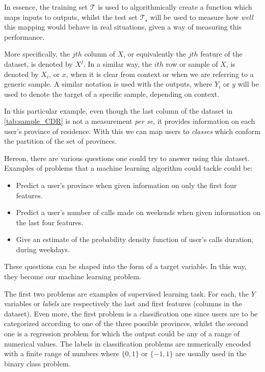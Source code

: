 In essence, the training set $\mathcal{T}$ is used to algorithmically create a function which maps inputs to outputs,  whilst the test set $\mathcal{T_s}$ will be used to measure how \textit{well} this mapping would behave in real situations, given a way of measuring this performance.

More specifically, the $jth$ column of $X$, or equivalently the $jth$ feature of the dataset, is denoted by $X^j$.
In a similar way, the $ith$ row or sample of $X$, is denoted by $X_i$, or $x$, when it is clear from context or when we are referring to a generic sample.
A similar notation is used with the outputs, where $Y_i$ or $y$ will be used to denote the target of a specific sample, depending on context.

In this particular example, even though the last column of the dataset in \cref{tab:sample_CDR} is not a measurement \textit{per se}, it provides information on each user's province of residence.
With this we can map users to \textit{classes} which conform the partition of the set of provinces.

Hereon, there are various questions one could try to answer using this dataset.
Examples of problems that a machine learning algorithm could tackle could be:

\begin{itemize}
\item Predict a user's province when given information on only the first four features.
\item Predict a user's number of calls made on weekends when given information on the last four features.
\item Give an estimate of the probability density function of user's calls duration, during weekdays.
\end{itemize}

These questions can be shaped into the form of a target variable.
In this way, they become our machine learning problem.

The first two problems are examples of supervised learning task.
For each, the $Y$ variables or \textit{labels} are respectively the last and first features (columns in the dataset).
Even more, the first problem is a classification one since users are to be categorized according to one of the three possible provinces, whilst the second one is a regression problem for which the output could be any of a range of numerical values.
The labels in classification problems are numerically encoded with a finite range of numbers where $\{0,1\}$ or $\{-1,1\}$ are usually used in the binary class problem.

